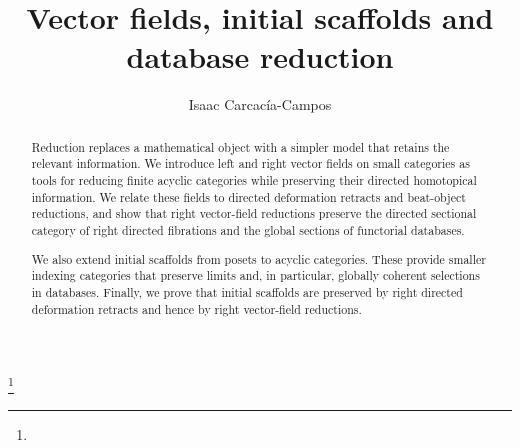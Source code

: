 \documentclass[12pt]{amsart}
\theoremstyle{definition}
\theoremstyle{remark}
\numberwithin{figure}{section}%
\begin{document}
\title[Vector fields, initial scaffolds and database reduction]{Vector fields, initial scaffolds and database reduction}
\thanks{}


\author[Isaac Carcacía-Campos]{%
	Isaac Carcacía-Campos%
}


		
 \address{%
           	Isaac Carcacía-Campos
            \\
              Departamento de Matem\'aticas, Universidade de Santiago de Compostela, 15782-SPAIN}




\begin{abstract} 
Reduction replaces a mathematical object with a simpler model that
retains the relevant information. We introduce left and right vector fields on small categories as tools for reducing finite acyclic categories while preserving their directed homotopical information. We relate these fields to directed deformation retracts and beat-object reductions, and show that right vector-field reductions preserve the directed sectional category of right directed fibrations and the global sections of functorial databases.

We also extend initial scaffolds from posets to acyclic categories. These provide smaller indexing categories that preserve limits and, in particular, globally coherent selections in databases. Finally, we prove that initial scaffolds are preserved by right directed deformation retracts and hence by right vector-field reductions.
\end{abstract}


\maketitle

\end{document}
